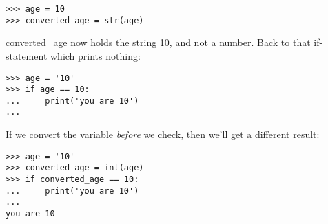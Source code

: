 \begin{listing}
\begin{verbatim}
>>> age = 10
>>> converted_age = str(age)
\end{verbatim}
\end{listing}

\noindent
converted\_age now holds the string 10, and not a number. Back to that if-statement which prints nothing:

\begin{listing}
\begin{verbatim}
>>> age = '10'
>>> if age == 10:
...     print('you are 10')
...
\end{verbatim}
\end{listing}

\noindent
If we convert the variable \emph{before} we check, then we'll get a different result:

\begin{listing}
\begin{verbatim}
>>> age = '10'
>>> converted_age = int(age)
>>> if converted_age == 10:
...     print('you are 10')
...
you are 10
\end{verbatim}
\end{listing}

\newpage
